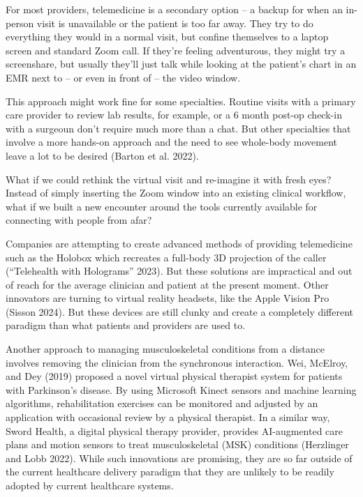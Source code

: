 \documentclass[
  letterpaper,
]{article}
\begin{document}
For most providers, telemedicine is a secondary option -- a backup for
when an in-person visit is unavailable or the patient is too far away.
They try to do everything they would in a normal visit, but confine
themselves to a laptop screen and standard Zoom call. If they're feeling
adventurous, they might try a screenshare, but usually they'll just talk
while looking at the patient's chart in an EMR next to -- or even in
front of -- the video window.

This approach might work fine for some specialties. Routine visits with
a primary care provider to review lab results, for example, or a 6 month
post-op check-in with a surgeoun don't require much more than a chat.
But other specialties that involve a more hands-on approach and the need
to see whole-body movement leave a lot to be desired (Barton et al.
2022).

What if we could rethink the virtual visit and re-imagine it with fresh
eyes? Instead of simply inserting the Zoom window into an existing
clinical workflow, what if we built a new encounter around the tools
currently available for connecting with people from afar?

Companies are attempting to create advanced methods of providing
telemedicine such as the Holobox which recreates a full-body 3D
projection of the caller ({``Telehealth with {Holograms}''} 2023). But
these solutions are impractical and out of reach for the average
clinician and patient at the present moment. Other innovators are
turning to virtual reality headsets, like the Apple Vision Pro (Sisson
2024). But these devices are still clunky and create a completely
different paradigm than what patients and providers are used to.

Another approach to managing musculoskeletal conditions from a distance
involves removing the clinician from the synchronous interaction. Wei,
McElroy, and Dey (2019) proposed a novel virtual physical therapist
system for patients with Parkinson's disease. By using Microsoft Kinect
sensors and machine learning algorithms, rehabilitation exercises can be
monitored and adjusted by an application with occasional review by a
physical therapist. In a similar way, Sword Health, a digital physical
therapy provider, provides AI-augmented care plans and motion sensors to
treat musculoskeletal (MSK) conditions (Herzlinger and Lobb 2022). While
such innovations are promising, they are so far outside of the current
healthcare delivery paradigm that they are unlikely to be readily
adopted by current healthcare systems.
\end{document}
